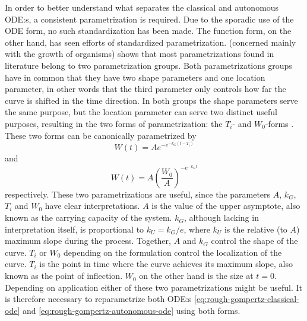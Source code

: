 In order to better understand what separates the classical and autonomous ODE:s, a consistent parametrization is required.
Due to the sporadic use of the ODE form, no such standardization has been made.
The function form, on the other hand, has seen efforts of standardized parametrization.
\cite{tjorve2017gompertz} (concerned mainly with the growth of organisms) shows that most parametrizations found in literature belong to two parametrization groups.
Both parametrizations groups have in common that they have two shape parameters and one location parameter, in other words that the third parameter only controls how far the curve is shifted in the time direction.
In both groups the shape parameters serve the same purpose, but the location parameter can serve two distinct useful purposes, resulting in the two forms of parametrization: the \(T_i\)- and \(W_0\)-forms \cite{tjorve2017gompertz}.
These two forms can be canonically parametrized by
\begin{equation} \label{eq:gompertz-ti-function}
  W(t) = A e^{-e^{-k_G(t-T_i)}}
\end{equation}
and
\begin{equation} \label{eq:gompertz-w0-function}
  W(t) = A \left(\frac{W_0}{A}\right)^{-e^{-k_G t}}
\end{equation}
respectively.
These two parametrizations are useful, since the parameters \(A\), \(k_G\), \(T_i\) and \(W_0\) have clear interpretations.
\(A\) is the value of the upper asymptote, also known as the carrying capacity of the system.
\(k_G\), although lacking in interpretation itself, is proportional to \(k_U = k_G / e\), where \(k_U\) is the relative (to \(A\)) maximum slope during the process.
Together, \(A\) and \(k_G\) control the shape of the curve.
\(T_i\) or \(W_0\) depending on the formulation control the localization of the curve.
\(T_i\) is the point in time where the curve achieves its maximum slope, also known as the point of inflection.
\(W_0\) on the other hand is the size at \(t=0\).
Depending on application either of these two parametrizations might be useful.
It is therefore necessary to reparametrize both ODE:s \ref{eq:rough-gompertz-classical-ode} and \ref{eq:rough-gompertz-autonomous-ode} using both forms.

